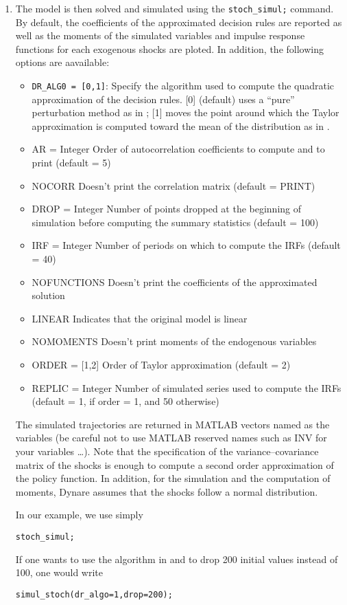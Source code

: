 \documentclass[11pt,a4paper]{article}
\begin{document}
\begin{enumerate}
\item The model is then solved and simulated using the {\tt stoch\_simul;} command. By default, the coefficients of the approximated decision rules are reported as well as the moments of the simulated variables and impulse response functions for each exogenous shocks are ploted. In addition, the following options are aavailable:
\begin{itemize}
\item {\tt DR\_ALG0 = [0,1]}: Specify the algorithm used to compute the quadratic approximation of the decision rules. [0] (default) uses a ``pure'' perturbation method as in \cite{SGU/02}; [1] moves the point around which the Taylor approximation is computed toward the mean of the distribution as in  \cite{COLL/JUIL/01a}.  
\item AR = Integer
Order of autocorrelation coefficients to compute and to print (default = 5)
\item NOCORR
Doesn't print the correlation matrix (default = PRINT)
\item DROP = Integer
Number of points dropped at the beginning of simulation before computing the summary statistics (default = 100)
\item IRF = Integer
Number of periods on which to compute the IRFs (default = 40)
\item NOFUNCTIONS
Doesn't print the coefficients of the approximated solution
\item LINEAR
Indicates that the original model is linear
\item NOMOMENTS
Doesn't print moments of the endogenous variables 
\item ORDER = [1,2]
Order of Taylor approximation (default = 2)
\item REPLIC = Integer
Number of simulated series used to compute the IRFs (default = 1, if order = 1, and 50 otherwise)
\end{itemize} 
The simulated trajectories are returned in MATLAB vectors named as the variables (be careful not to use MATLAB reserved names such as INV for your variables \ldots). Note that the specification of the variance--covariance matrix of the shocks is enough to compute a second order approximation of the policy function. In addition, for the simulation and the computation of moments, {\sc Dynare} assumes that the shocks follow a normal distribution.

In our example, we use simply 
\begin{verbatim}
stoch_simul;
\end{verbatim}

If one wants to use the algorithm in \cite{COLL/JUIL/01a} and to drop 200 initial values instead of 100, one would write
\begin{verbatim}
simul_stoch(dr_algo=1,drop=200);
\end{verbatim}
\end{enumerate}
\end{document}
